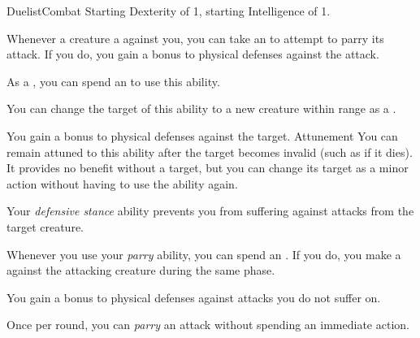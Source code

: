     \begin{feat}{Duelist}{Combat}
        \featpre Starting Dexterity of 1, starting Intelligence of 1.
        \featben

         Whenever a creature  a  against you, you can take an  to attempt to parry its attack.
        If you do, you gain a  bonus to physical defenses against the attack.

         As a , you can spend an  to use this ability.
        \begin{ability}
            \begin{spelltargetinginfo}
                \spellspecial You can change the target of this ability to a new creature within range as a .
            \end{spelltargetinginfo}
            \begin{spelleffects}
                \spelleffect You gain a  bonus to physical defenses against the target.
                \spelldur Attunement
                \spellspecial You can remain attuned to this ability after the target becomes invalid (such as if it dies).
                It provides no benefit without a target, but you can change its target as a minor action without having to use the ability again.
            \end{spelleffects}
        \end{ability}

        \ff[4]{} 

         Your \textit{defensive stance} ability prevents you from suffering  against attacks from the target creature.

         Whenever you use your \textit{parry} ability, you can spend an .
        If you do, you make a  against the attacking creature during the same phase.

         You gain a  bonus to physical defenses against attacks you do not suffer  on.

         Once per round, you can \textit{parry} an attack without spending an immediate action.
    \end{feat}

